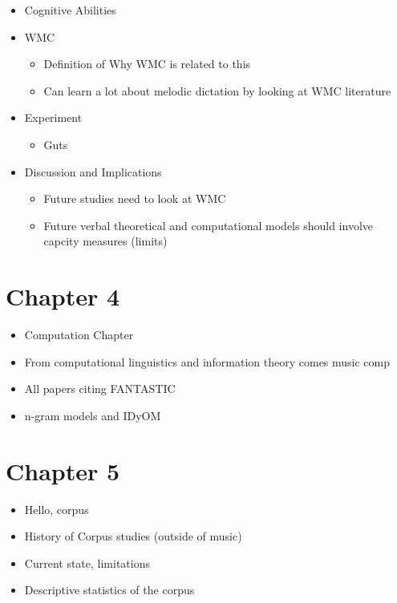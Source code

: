 \documentclass[]{book}
\providecommand{\tightlist}{%
  \setlength{\itemsep}{0pt}\setlength{\parskip}{0pt}}
\theoremstyle{definition}
\theoremstyle{definition}
\theoremstyle{definition}
\theoremstyle{remark}
\begin{document}
\begin{itemize}
\tightlist
\item
  Cognitive Abilities
\item
  WMC

  \begin{itemize}
  \tightlist
  \item
    Definition of Why WMC is related to this
  \item
    Can learn a lot about melodic dictation by looking at WMC literature
  \end{itemize}
\item
  Experiment

  \begin{itemize}
  \tightlist
  \item
    Guts
  \end{itemize}
\item
  Discussion and Implications

  \begin{itemize}
  \tightlist
  \item
    Future studies need to look at WMC
  \item
    Future verbal theoretical and computational models should involve
    capcity measures (limits)
  \end{itemize}
\end{itemize}

\hypertarget{chapter-4}{%
\section{Chapter 4}\label{chapter-4}}

\begin{itemize}
\tightlist
\item
  Computation Chapter
\item
  From computational linguistics and information theory comes music comp
\item
  All papers citing FANTASTIC
\item
  n-gram models and IDyOM
\end{itemize}

\hypertarget{chapter-5}{%
\section{Chapter 5}\label{chapter-5}}

\begin{itemize}
\tightlist
\item
  Hello, corpus
\item
  History of Corpus studies (outside of music)
\item
  Current state, limitations
\item
  Descriptive statistics of the corpus
\end{itemize}
\end{document}

